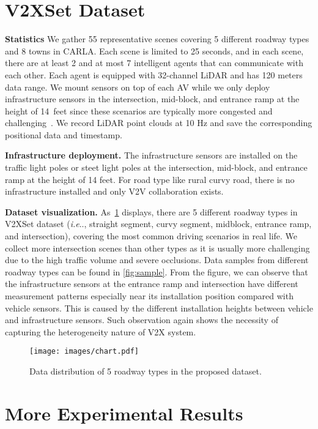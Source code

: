 \documentclass[runningheads]{llncs}
\makeatletter
\DeclareRobustCommand\onedot{\futurelet\@let@token\@onedot}
\def\@onedot{\ifx\@let@token.\else.\null\fi\xspace}
\def\ie{\emph{i.e}\onedot} \def\Ie{\emph{I.e}\onedot}
\makeatother
\begin{document}
\section{V2XSet Dataset}
\label{sec:opv2x-dataset}
\noindent\textbf{Statistics} We gather 55 representative scenes covering 5 different roadway types and 8 towns in CARLA. Each scene is limited to 25 seconds, and in each scene, there are at least 2 and at most 7 intelligent agents that can communicate with each other. Each agent is equipped with 32-channel LiDAR and has 120 meters data range. We mount sensors on top of each AV while we only deploy infrastructure sensors in the intersection, mid-block, and entrance ramp at the height of 14~feet since these scenarios are typically more congested and challenging~\cite{guo2020evaluating}. We record LiDAR point clouds at 10 Hz and save the corresponding positional data and timestamp.

\noindent\textbf{Infrastructure deployment. }The infrastructure sensors
are installed on the traffic light poles or steet light poles at the intersection, mid-block, and entrance ramp at the height of 14 feet. For road type like rural curvy road, there is no infrastructure installed and only V2V collaboration exists. 



\noindent\textbf{Dataset visualization. }
As~\cref{fig:chart} displays, there are 5 different roadway types in V2XSet dataset (\ie, straight segment, curvy segment, midblock, entrance ramp, and intersection),
covering the most common driving scenarios in real life. We collect more intersection scenes than other types as it is usually more challenging due to the high traffic volume and severe occlusions. Data samples from different roadway types can be found in \cref{fig:sample}. From the figure, we can observe that the infrastructure sensors at the entrance ramp and intersection have different measurement patterns especially near its installation position compared with vehicle sensors. This is caused by the different installation heights between vehicle and infrastructure sensors. Such observation again shows the necessity of capturing the heterogeneity nature of V2X system. 

\begin{figure}[!ht]
\centering
\texttt{[image: images/chart.pdf]}
\caption{Data distribution of 5 roadway types in the proposed dataset.}
\label{fig:chart}
\end{figure}

\section{More Experimental Results}
\label{sec:additional-results}
\end{document}
